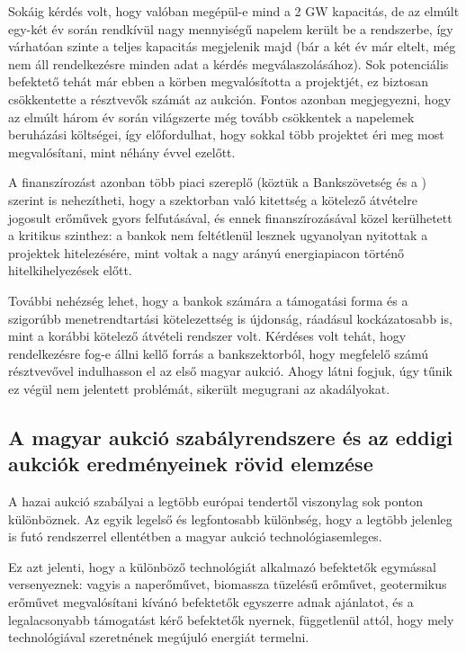 \documentclass[twoside, magyar, showtrims]{corvinusphd}
\begin{document}
Sokáig kérdés volt, hogy valóban megépül-e mind a 2 GW kapacitás,
de az elmúlt egy-két év során rendkívül nagy mennyiségű
napelem került be a rendszerbe, így várhatóan szinte a teljes
kapacitás megjelenik majd (bár a két év 
már eltelt, még nem áll rendelkezésre minden adat
a kérdés megválaszolásához). Sok potenciális befektető tehát 
már ebben a körben megvalósította a projektjét, ez biztosan
csökkentette a résztvevők számát az aukción. Fontos azonban megjegyezni,
hogy az elmúlt három év során világszerte még tovább csökkentek 
a napelemek beruházási költségei, így előfordulhat, hogy
sokkal több projektet éri meg most megvalósítani, mint 
néhány évvel ezelőtt.

A finanszírozást azonban több piaci szereplő
(köztük a Bankszövetség és a ) szerint is nehezítheti,
hogy a szektorban való kitettség a kötelező átvételre
jogosult erőművek gyors felfutásával, 
és ennek finanszírozásával közel kerülhetett a kritikus szinthez:
a bankok nem feltétlenül lesznek ugyanolyan nyitottak
a projektek hitelezésére, mint voltak a nagy arányú
energiapiacon történő hitelkihelyezések előtt.

További nehézség lehet, 
hogy a bankok számára a támogatási forma  
és a szigorúbb menetrendtartási kötelezettség is újdonság,
ráadásul kockázatosabb is, mint a korábbi kötelező átvételi
rendszer volt. Kérdéses volt tehát, hogy rendelkezésre fog-e állni
kellő forrás a bankszektorból, hogy megfelelő számú
résztvevővel indulhasson el az első magyar aukció.
Ahogy látni fogjuk, úgy tűnik ez végül nem jelentett problémát,
sikerült megugrani az akadályokat.

\subsection{A magyar aukció szabályrendszere és az eddigi aukciók eredményeinek rövid elemzése}

A hazai aukció szabályai a legtöbb európai
tendertől viszonylag sok ponton különböznek.
Az egyik legelső és legfontosabb különbség,
hogy a legtöbb jelenleg is futó rendszerrel ellentétben
a magyar aukció technológiasemleges.

Ez azt jelenti, hogy a különböző technológiát
alkalmazó befektetők egymással versenyeznek:
vagyis a naperőművet, biomassza tüzelésű erőművet,
geotermikus erőművet megvalósítani kívánó befektetők egyszerre adnak
ajánlatot, és a legalacsonyabb támogatást
kérő befektetők nyernek, függetlenül attól,
hogy mely technológiával szeretnének megújuló energiát termelni.
\end{document}

